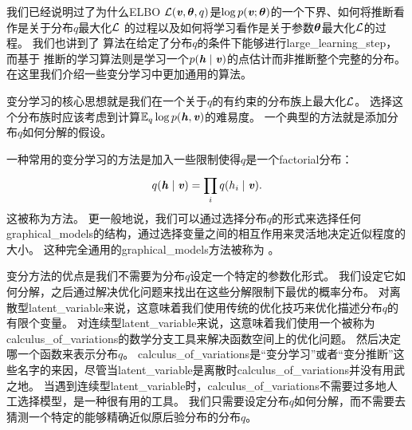 我们已经说明过了为什么\gls{ELBO} $\mathcal{L}(\boldsymbol{\mathit{v}},\boldsymbol{\theta},q)$是$\log  p(\boldsymbol{\mathit{v}};\boldsymbol{\theta})$的一个下界、如何将推断看作是关于分布$q$最大化$\mathcal{L}$ 的过程以及如何将学习看作是关于参数$\boldsymbol{\theta}$最大化$\mathcal{L}$的过程。
我们也讲到了\,\,算法在给定了分布$q$的条件下能够进行\gls{large_learning_step}，而基于\,\,推断的学习算法则是学习一个$p(\boldsymbol{\mathit{h}} \mid \boldsymbol{\mathit{v}})$的点估计而非推断整个完整的分布。
在这里我们介绍一些变分学习中更加通用的算法。

变分学习的核心思想就是我们在一个关于$q$的有约束的分布族上最大化$\mathcal{L}$。
选择这个分布族时应该考虑到计算$\mathbb{E}_q \log p(\boldsymbol{\mathit{h}},\boldsymbol{\mathit{v}})$的难易度。
一个典型的方法就是添加分布$q$如何分解的假设。


一种常用的变分学习的方法是加入一些限制使得$q$是一个\gls{factorial}分布：
\begin{align}
	q(\boldsymbol{\mathit{h}}\mid\boldsymbol{\mathit{v}}) = \prod_{i}^{}q(h_i \mid \boldsymbol{\mathit{v}}).
\end{align}
这被称为方法。
更一般地说，我们可以通过选择分布$q$的形式来选择任何\gls{graphical_models}的结构，通过选择变量之间的相互作用来灵活地决定近似程度的大小。
这种完全通用的\gls{graphical_models}方法被称为 \citep{Saul96}。


变分方法的优点是我们不需要为分布$q$设定一个特定的参数化形式。
我们设定它如何分解，之后通过解决优化问题来找出在这些分解限制下最优的概率分布。
对离散型\gls{latent_variable}来说，这意味着我们使用传统的优化技巧来优化描述分布$q$的有限个变量。
对连续型\gls{latent_variable}来说，这意味着我们使用一个被称为\gls{calculus_of_variations}的数学分支工具来解决函数空间上的优化问题。
然后决定哪一个函数来表示分布$q$。
\gls{calculus_of_variations}是``变分学习''或者``变分推断''这些名字的来因，尽管当\gls{latent_variable}是离散时\gls{calculus_of_variations}并没有用武之地。
当遇到连续型\gls{latent_variable}时，\gls{calculus_of_variations}不需要过多地人工选择模型，是一种很有用的工具。
我们只需要设定分布$q$如何分解，而不需要去猜测一个特定的能够精确近似原后验分布的分布$q$。


